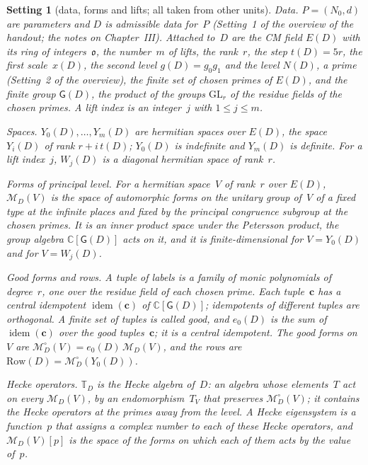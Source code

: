 \documentclass[11pt,a4paper]{article}
\newcommand{\kw}[1]{\emph{#1}}
\newcommand{\m}[1]{\mbox{$#1$}}        %
\theoremstyle{plainx}
\theoremstyle{uprightx}
\newtheorem{setting}[theorem]{Setting}          %
\newcommand{\CC}{\mathbb{C}}
\newcommand{\Row}{\mathrm{Row}}
\newcommand{\Mf}{\mathcal{M}}
\newcommand{\Mg}{\mathcal{M}^{\circ}}
\newcommand{\Hk}{\mathbb{T}}
\newcommand{\sfG}{\mathsf{G}}
\newcommand{\idem}{\operatorname{idem}}
\begin{document}
\begin{setting}[data, forms and lifts; all taken from other units]\label{set:data}
\emph{Data.} $P=(N_0,d)$ are parameters and $D$ is admissible data for~$P$ (Setting~1 of the overview of the
handout; the notes on Chapter~III). Attached to~$D$ are the CM field \m{E(D)} with its ring of
integers~$\mathfrak{o}$, the number~$m$ of lifts, the rank~$r$, the step \m{t(D)=5r}, the first scale~\m{x(D)}, the second
level \m{g(D)=g_0g_1} and the level \m{N(D)}, a prime (Setting~2 of the overview), the finite set of \kw{chosen
primes} of \m{E(D)}, and the finite group $\sfG(D)$, the product of the groups $\mathrm{GL}_r$ of the residue fields of the chosen primes. A
\kw{lift index} is an integer~$j$ with \m{1\le j\le m}.

\emph{Spaces.} $Y_0(D),\dots,Y_m(D)$ are hermitian spaces over \m{E(D)}, the space $Y_i(D)$ of rank \m{r+i\,t(D)};
$Y_0(D)$ is indefinite and $Y_m(D)$ is definite. For a lift index~$j$, $W_j(D)$ is a diagonal hermitian space of
rank~$r$.

\emph{Forms of principal level.} For a hermitian space~$V$ of rank~$r$ over \m{E(D)}, $\Mf_D(V)$ is the space of
automorphic forms on the unitary group of~$V$ of a fixed type at the infinite places and fixed by the principal
congruence subgroup at the chosen primes. It is an inner product space under the Petersson product, the group
algebra \m{\CC[\sfG(D)]} acts on it, and it is finite-dimensional for \m{V=Y_0(D)} and for \m{V=W_j(D)}.

\emph{Good forms and rows.} A \kw{tuple of labels} is a family of monic polynomials of degree~$r$, one over the
residue field of each chosen prime. Each tuple~$\mathbf{c}$ has a central idempotent \m{\idem(\mathbf{c})} of
\m{\CC[\sfG(D)]}; idempotents of different tuples are orthogonal. A finite set of tuples is called \kw{good}, and
$e_0(D)$ is the sum of \m{\idem(\mathbf{c})} over the good tuples~$\mathbf{c}$; it is a central idempotent. The
\kw{good forms} on~$V$ are \m{\Mg_D(V)=e_0(D)\,\Mf_D(V)}, and the \kw{rows} are \m{\Row(D)=\Mg_D(Y_0(D))}.

\emph{Hecke operators.} $\Hk_D$ is the Hecke algebra of~$D$: an algebra whose elements~$T$ act on every
$\Mf_D(V)$, by an endomorphism~$T_V$ that preserves $\Mg_D(V)$; it contains the Hecke operators at the primes
away from the level. A \kw{Hecke eigensystem} is a function~$p$ that assigns a complex number to each of these
Hecke operators, and \m{\Mf_D(V)[p]} is the space of the forms on which each of them acts by the value of~$p$.


\end{setting}
\end{document}
